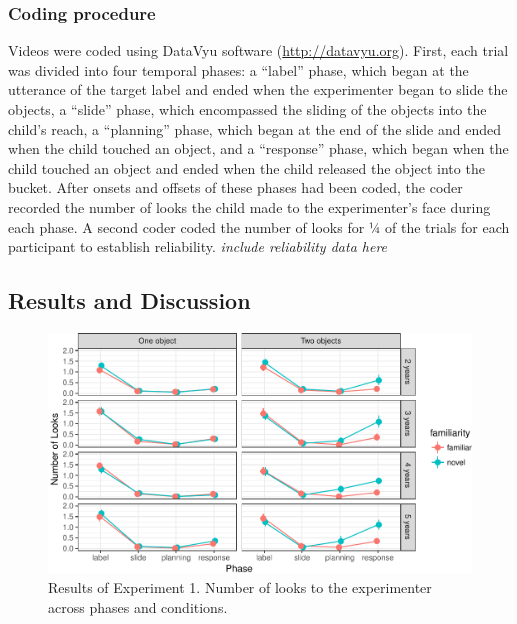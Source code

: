 \documentclass[10pt, letterpaper]{article}
\newenvironment{CodeChunk}{}{}
\begin{document}
\subsubsection{Coding procedure}\label{coding-procedure}

Videos were coded using DataVyu software (\url{http://datavyu.org}).
First, each trial was divided into four temporal phases: a ``label''
phase, which began at the utterance of the target label and ended when
the experimenter began to slide the objects, a ``slide'' phase, which
encompassed the sliding of the objects into the child's reach, a
``planning'' phase, which began at the end of the slide and ended when
the child touched an object, and a ``response'' phase, which began when
the child touched an object and ended when the child released the object
into the bucket. After onsets and offsets of these phases had been
coded, the coder recorded the number of looks the child made to the
experimenter's face during each phase. A second coder coded the number
of looks for ¼ of the trials for each participant to establish
reliability. \emph{include reliability data here}

\subsection{Results and Discussion}\label{results-and-discussion}

\begin{CodeChunk}
\begin{figure}[h]

{\centering \includegraphics{figs/results_e1-1} 

}

\caption[Results of Experiment 1]{Results of Experiment 1. Number of looks to the experimenter across phases and conditions.}\label{fig:results_e1}
\end{figure}
\end{CodeChunk}
\end{document}
